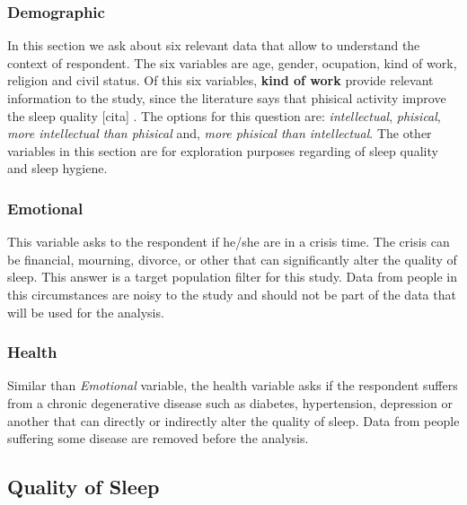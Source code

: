\documentclass[]{book}
\begin{document}
\subsubsection{Demographic}\label{demographic}

In this section we ask about six relevant data that allow to understand
the context of respondent. The six variables are age, gender, ocupation,
kind of work, religion and civil status. Of this six variables,
\textbf{kind of work} provide relevant information to the study, since
the literature says that phisical activity improve the sleep quality
{[}cita{]} . The options for this question are: \emph{intellectual},
\emph{phisical}, \emph{more intellectual than phisical} and, \emph{more
phisical than intellectual}. The other variables in this section are for
exploration purposes regarding of sleep quality and sleep hygiene.

\subsubsection{Emotional}\label{emotional}

This variable asks to the respondent if he/she are in a crisis time. The
crisis can be financial, mourning, divorce, or other that can
significantly alter the quality of sleep. This answer is a target
population filter for this study. Data from people in this circumstances
are noisy to the study and should not be part of the data that will be
used for the analysis.

\subsubsection{Health}\label{health}

Similar than \emph{Emotional} variable, the health variable asks if the
respondent suffers from a chronic degenerative disease such as diabetes,
hypertension, depression or another that can directly or indirectly
alter the quality of sleep. Data from people suffering some disease are
removed before the analysis.

\subsection{Quality of Sleep}\label{quality-of-sleep}
\end{document}
